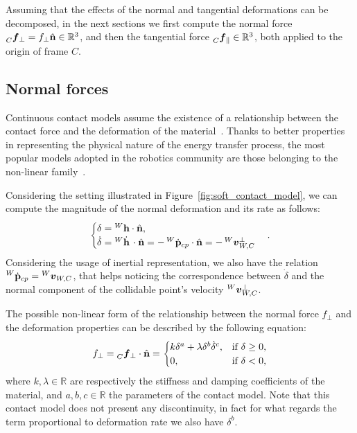 Assuming that the effects of the normal and tangential deformations can be decomposed, in the next sections we first compute the normal force $\forcelin[C]_\perp = f_\perp \hat{\mathbf{n}} \in \mathbb{R}^3$, and then the tangential force $\forcelin[C]_\parallel \in \mathbb{R}^3$, both applied to the origin of frame $C$.

\subsection{Normal forces}
\label{section:normal_forces}

Continuous contact models assume the existence of a relationship between the contact force and the deformation of the material~\parencite{romualdi_modeling_2021}.
Thanks to better properties in representing the physical nature of the energy transfer process, the most popular models adopted in the robotics community are those belonging to the non-linear family~\citep{azad_model_2016}.

Considering the setting illustrated in Figure~\ref{fig:soft_contact_model}, we can compute the magnitude of the normal deformation and its rate as follows:
%
\begin{equation*}
    \begin{cases}
        \delta = {}^W \mathbf{h} \cdot \hat{\mathbf{n}}, \\
        \dot{\delta} = {}^W \dot{\mathbf{h}} \, \cdot \hat{\mathbf{n}} = -\posd[W]_{cp} \cdot \hat{\mathbf{n}} = -\vellin[W]_{W,C}^\perp
    \end{cases}
    .
\end{equation*}
%
Considering the usage of inertial representation, we also have the relation $\posd[W]_{cp} = \vellin[W]_{W,C}$, that helps noticing the correspondence between $\dot{\delta}$ and the normal component of the collidable point's velocity $\vellin[W]^\perp_{W,C}$.

The possible non-linear form of the relationship between the normal force $f_\perp$ and the deformation properties can be described by the following equation:
%
\begin{equation*}
    f_\perp = \forcelin[C]_\perp \cdot \hat{\mathbf{n}} =
    \begin{cases}
        k \delta^a + \lambda \delta^b \dot{\delta}^c ,& \text{if $\delta\geq0$,} \\
        0 ,& \text{if $\delta<0$,}
    \end{cases}
\end{equation*}
%
where $k, \lambda \in \mathbb{R}$ are respectively the stiffness and damping coefficients of the material, and $a, b, c \in \mathbb{R}$ the parameters of the contact model.
Note that this contact model does not present any discontinuity, in fact for what regards the term proportional to deformation rate we also have $\delta^b$.

